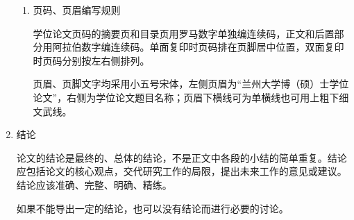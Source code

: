 \documentclass[twoside,longtitle]{LZUthesis}
\begin{document}
\begin{enumerate}
\begin{enumerate}
\item 页码、页眉编写规则


学位论文页码的摘要页和目录页用罗马数字单独编连续码，正文和后置部分用阿拉伯数字编连续码。单面复印时页码排在页脚居中位置，双面复印时页码分别按左右侧排列。


页眉、页脚文字均采用小五号宋体，左侧页眉为“兰州大学博（硕）士学位论文”，右侧为学位论文题目名称；页眉下横线可为单横线也可用上粗下细文武线。

\end{enumerate}
\item 结论


论文的结论是最终的、总体的结论，不是正文中各段的小结的简单重复。结论应包括论文的核心观点，交代研究工作的局限，提出未来工作的意见或建议。结论应该准确、完整、明确、精练。


如果不能导出一定的结论，也可以没有结论而进行必要的讨论。

\end{enumerate}
\end{document}
